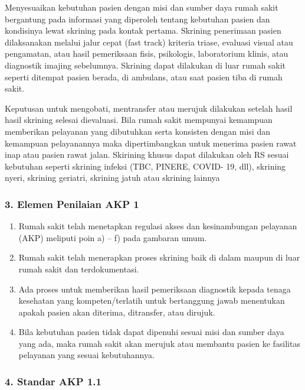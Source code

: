\documentclass[
]{book}
\providecommand{\tightlist}{%
  \setlength{\itemsep}{0pt}\setlength{\parskip}{0pt}}
\begin{document}
Menyesuaikan kebutuhan pasien dengan misi dan sumber daya rumah sakit bergantung pada informasi yang diperoleh tentang kebutuhan pasien dan kondisinya lewat skrining pada kontak pertama. Skrining penerimaan pasien dilaksanakan melalui jalur cepat (fast track) kriteria triase, evaluasi visual atau pengamatan, atau hasil pemeriksaan fisis, psikologis, laboratorium klinis, atau diagnostik imajing sebelumnya. Skrining dapat dilakukan di luar rumah sakit seperti ditempat pasien berada, di ambulans, atau saat pasien tiba di rumah sakit.

Keputusan untuk mengobati, mentransfer atau merujuk dilakukan setelah hasil hasil skrining selesai dievaluasi. Bila rumah sakit mempunyai kemampuan memberikan pelayanan yang dibutuhkan serta konsisten dengan misi dan kemampuan pelayanannya maka dipertimbangkan untuk menerima pasien rawat inap atau pasien rawat jalan. Skirining khusus dapat dilakukan oleh RS sesuai kebutuhan seperti skrining infeksi (TBC, PINERE, COVID- 19, dll), skrining nyeri, skrining geriatri, skrining jatuh atau skrining lainnya

\hypertarget{elemen-penilaian-akp-1}{%
\subsubsection*{3. Elemen Penilaian AKP 1}\label{elemen-penilaian-akp-1}}

\begin{enumerate}
\def\labelenumi{\alph{enumi}.}
\tightlist
\item
  Rumah sakit telah menetapkan regulasi akses dan kesinambungan pelayanan (AKP) meliputi poin a) -- f) pada gambaran umum.
\item
  Rumah sakit telah menerapkan proses skrining baik di dalam maupun di luar rumah sakit dan terdokumentasi.
\item
  Ada proses untuk memberikan hasil pemeriksaan diagnostik kepada tenaga kesehatan yang kompeten/terlatih untuk bertanggung jawab menentukan apakah pasien akan diterima, ditransfer, atau dirujuk.
\item
  Bila kebutuhan pasien tidak dapat dipenuhi sesuai misi dan sumber daya yang ada, maka rumah sakit akan merujuk atau membantu pasien ke fasilitas pelayanan yang sesuai kebutuhannya.
\end{enumerate}

\hypertarget{standar-akp-1.1}{%
\subsubsection*{4. Standar AKP 1.1}\label{standar-akp-1.1}}
\end{document}

